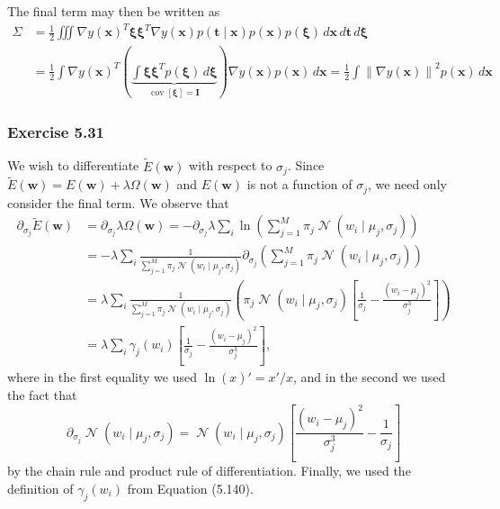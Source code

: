 \documentclass[12pt, a4paper]{article}
\newcommand{\vect}[1]{\bm{#1}}
\newcommand{\norm}[1]{\left\lVert#1\right\rVert}
\DeclareMathOperator{\N}{\mathcal{N}}
\DeclareMathOperator{\cov}{\operatorname{cov}}
\begin{document}
The final term may then be written as
\begin{align*}
	\Sigma &= \frac{1}{2} 
	\iiint  
	\nabla y (\vect{x})^T
	\vect{\xi}
	\vect{\xi}^T
	\nabla  y (\vect{x})
	p(\vect{t} \mid \vect{x}) p (\vect{x}) p (\vect{\xi})
	\, d \vect{x} \, d \vect{t} \, d \vect{\xi} \\
	&= \frac{1}{2} 
	\int  
	\nabla  y (\vect{x})^T
	\left( 
	\underbrace{\int 
		\vect{\xi}
		\vect{\xi}^T
		p (\vect{\xi})
		\, d \vect{\xi}}_{\cov \left[ \vect{\xi}\right] =  \vect{I}}
	 \right)
	\nabla  y (\vect{x})
	 p (\vect{x})
	\, d \vect{x}  
	= \frac{1}{2} 
	\int  
	\norm{\nabla y (\vect{x})}^2
	p (\vect{x})
	\, d \vect{x}
\end{align*}



\subsubsection*{Exercise 5.31}
We wish to differentiate $\widetilde{E}(\vect{w})$ with respect to $\sigma_j$.
Since $\widetilde{E}(\vect{w}) = E(\vect{w}) + \lambda \Omega(\vect{w})$ and $E(\vect{w})$ is not a function of $\sigma_j$, we need only consider the final term.
We observe that
\begin{align*}
	\partial_{\sigma_j}  \widetilde{E}(\vect{w})&= 
	\partial_{\sigma_j}  \lambda \Omega(\vect{w})
	=
-	\partial_{\sigma_j} \lambda \sum_i \ln \left( \sum_{j=1}^{M} \pi_j \N \left( w_i \mid \mu_j, \sigma_j \right) \right) \\
	&= - \lambda\sum_i \frac{1}{\sum_{j=1}^{M} \pi_j \N \left( w_i \mid \mu_j, \sigma_j \right)}
	\partial_{\sigma_j} \left( 
	\sum_{j=1}^{M} \pi_j \N \left( w_i \mid \mu_j, \sigma_j \right)
	 \right) \\
	 &= \lambda\sum_i \frac{1}{\sum_{j=1}^{M} \pi_j \N \left( w_i \mid \mu_j, \sigma_j \right)}
	 \left( \pi_j
	 \N \left( w_i \mid \mu_j, \sigma_j \right)
	  \left[ \frac{1}{\sigma_j} 
	 -
	 \frac{(w_i - \mu_j)^2}{\sigma_j^3}
	  \right] \right)
	  \\
	  &= \lambda \sum_i \gamma_j(w_i) 
	  \left[ \frac{1}{\sigma_j} 
	  -
	  \frac{(w_i - \mu_j)^2}{\sigma_j^3}
	  \right],
\end{align*}
where in the first equality we used $\ln (x)' = x' / x$, and in the second we used the fact that
\begin{equation*}
	\partial_{\sigma_j} \N \left( w_i \mid \mu_j, \sigma_j \right)
	= \N \left( w_i \mid \mu_j, \sigma_j \right) 
	\left[ 
	\frac{(w_i - \mu_j)^2}{\sigma_j^3}
	-
	\frac{1}{\sigma_j} 
	\right]
\end{equation*}
by the chain rule and product rule of differentiation.
Finally, we used the definition of $\gamma_j(w_i) $ from Equation (5.140).
\end{document}
